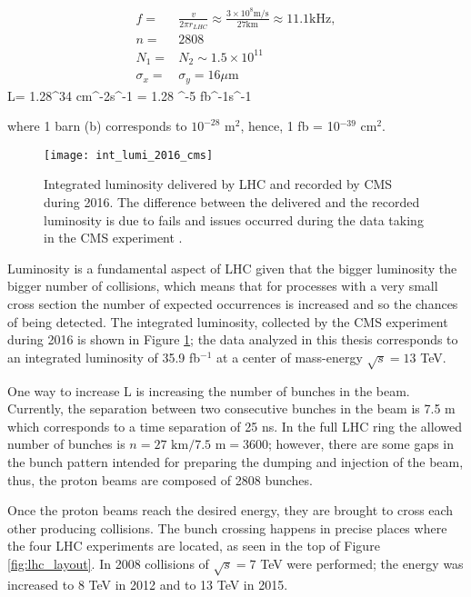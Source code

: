 \begin{align}
  f=&\frac{v}{2\pi r_{LHC}}\approx\frac{3\times10^8\textrm{m/s}}{27\textrm{km}}\approx 11.1 \textrm{kHz},\nonumber \\
  n=&2808\nonumber \\ 
  N_1=&N_2 \sim1.5\times 10^{11}\nonumber\\
  \sigma_x=&\sigma_y=16\mu \textrm{m}\nonumber
\end{align}
\beqn
L= 1.28^{34} \textrm{cm}^{-2}\textrm{s}^{-1} = 1.28 ^{-5} \textrm{fb}^{-1}\textrm{s}^{-1}
\eeqn

\noindent where 1 barn (b) corresponds to $10^{-28}$ m$^2$, hence, 1 fb = 10$^{-39}$ cm$^2$. 

\begin{figure}[!h]
\centering
\texttt{[image: int\_lumi\_2016\_cms]}
\caption [Integrated luminosity delivered by LHC and recorded by CMS during 2016]{Integrated luminosity delivered by LHC and recorded by CMS during 2016. The difference between the delivered and the recorded luminosity is due to fails and issues occurred during the data taking in the CMS experiment \cite{lumi}.}\label{fig:lumi}
\end{figure}

Luminosity is a fundamental aspect of LHC given that the bigger luminosity the bigger number of collisions, which means that for processes with a very small cross section the number of expected occurrences is increased and so the chances of being detected. The integrated luminosity, collected by the CMS experiment during 2016 is shown in Figure \ref{fig:lumi}; the data analyzed in this thesis corresponds to an integrated luminosity of 35.9 fb$^{-1}$ at a center of mass-energy $\sqrt{s}=13$ TeV. 

One way to increase L is increasing the number of bunches in the beam. Currently, the separation between two consecutive bunches in the beam is 7.5 m which corresponds to a time separation of 25 ns. In the full LHC ring the allowed number of bunches is $n=27\textrm{ km}/7.5\textrm{ m}=3600$; however, there are some gaps in the bunch pattern intended for preparing the dumping and injection of the beam, thus, the proton beams are composed of 2808 bunches.

Once the proton beams reach the desired energy, they are brought to cross each other producing \pp collisions. The bunch crossing happens in precise places where the four LHC experiments are located, as seen in the top of Figure \ref{fig:lhc_layout}. In 2008 \pp collisions of $\sqrt{s}=7$ TeV were performed; the energy was increased to 8 TeV in 2012 and to 13 TeV in 2015.

